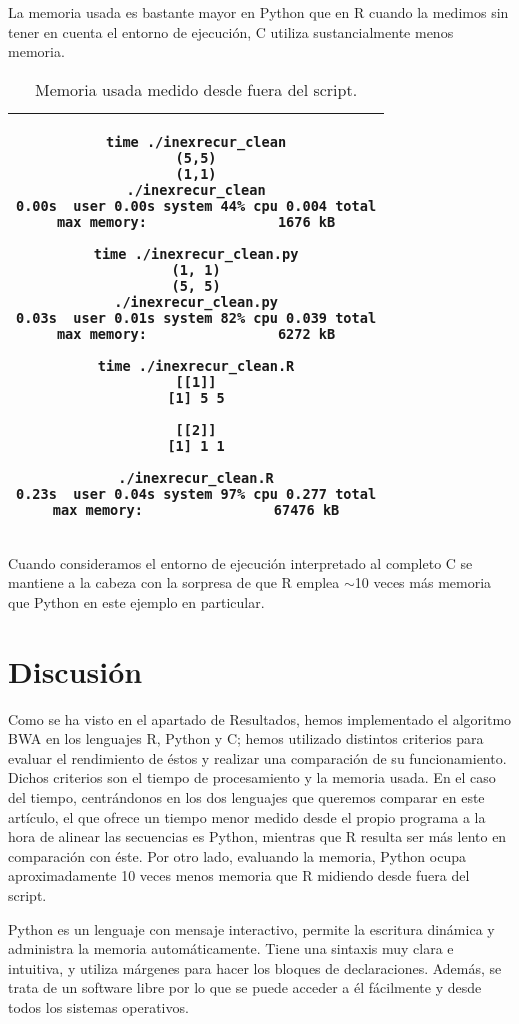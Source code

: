 \documentclass{article}
\newcommand{\tempcaption}{}
\newenvironment{codesnip}[1]{
\begin{table}[h!]
\gdef\tempcaption{#1}
\centering
\begin{tabular}{|c|}
\hline}
{\\\hline
\end{tabular}
\caption{\tempcaption}
\end{table}}
\newcommand{\python}{Python }
\begin{document}
La memoria usada es bastante mayor  en	Python	que  en  R  cuando  la
medimos sin tener en cuenta el entorno de ejecución, C utiliza
sustancialmente menos memoria.

\vfill
\begin{codesnip}{Memoria usada medido desde fuera del script.}
\begin{lstlisting}
time ./inexrecur_clean
(5,5)
(1,1)
./inexrecur_clean
0.00s  user 0.00s system 44% cpu 0.004 total
max memory:                1676 kB

time ./inexrecur_clean.py
(1, 1)
(5, 5)
./inexrecur_clean.py
0.03s  user 0.01s system 82% cpu 0.039 total
max memory:                6272 kB

time ./inexrecur_clean.R
[[1]]
[1] 5 5

[[2]]
[1] 1 1

./inexrecur_clean.R
0.23s  user 0.04s system 97% cpu 0.277 total
max memory:                67476 kB
\end{lstlisting}
\end{codesnip}

Cuando consideramos el entorno de ejecución interpretado al completo C
se mantiene a la cabeza con la sorpresa de que R emplea $\sim$10 veces
más memoria que \python en este ejemplo en particular.

\section{Discusión}
\vspace{-0.25cm}

Como se ha visto en el apartado de Resultados, hemos  implementado  el
algoritmo BWA  en  los	lenguajes  R,  Python  y  C;  hemos  utilizado
distintos criterios para evaluar el rendimiento de  éstos  y  realizar
una comparación de su funcionamiento.  Dichos criterios son el	tiempo
de  procesamiento  y  la  memoria  usada.   En	el  caso  del  tiempo,
centrándonos en los  dos  lenguajes  que  queremos  comparar  en  este
artículo, el que  ofrece  un  tiempo  menor  medido  desde  el	propio
programa a la hora de alinear las secuencias es Python, mientras que R
resulta ser más  lento	en  comparación  con  éste.   Por  otro  lado,
evaluando la memoria, Python  ocupa  aproximadamente  10  veces  menos
memoria que R midiendo desde fuera del script.

Python es un lenguaje con mensaje interactivo,	permite  la  escritura
dinámica y administra la memoria automáticamente.  Tiene una  sintaxis
muy clara e intuitiva, y utiliza márgenes para hacer  los  bloques  de
declaraciones.	Además, se trata de un software libre por  lo  que  se
puede acceder a él fácilmente y desde todos los  sistemas  operativos.
\cite{fangohr_2004}
\end{document}
